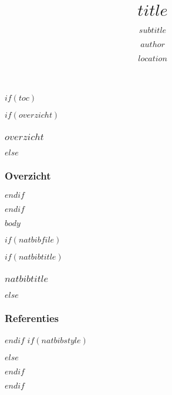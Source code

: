 \documentclass[$if(fontsize)$$fontsize$$else$10pt$endif$, $if(handout)$handout,$endif$ xetex]{beamer}
\title{$title$}
\subtitle{$subtitle$}
\author{$author$}
\institute{$institute$}
\date{$location$}
\date{}
\begin{document}
\begin{frame}[plain, label=intro, noframenumbering]
  \titlepage
\end{frame}

$if(toc)$
\begin{frame}
$if(overzicht)$
  \frametitle{$overzicht$}
$else$
  \frametitle{Overzicht}
$endif$
	\tableofcontents
\end{frame}
$endif$

$body$

$if(natbibfile)$
\begin{frame}
$if(natbibtitle)$
\frametitle{$natbibtitle$}
$else$
\frametitle{Referenties}
$endif$
$if(natbibstyle)$

$else$

$endif$
  
\end{frame}
$endif$
\end{document}
